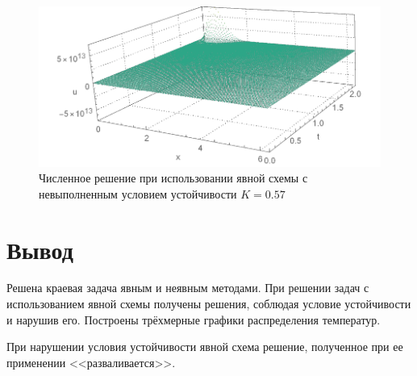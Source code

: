 \documentclass[
11pt,
master, %
subf, %
href, %
colorlinks=true, %
]{disser}
\begin{document}
\begin{figure}[htbp]
  \centering
  \includegraphics[width=1\linewidth]{vis_exp_2}
  \caption{Численное решение при использовании явной схемы с невыполненным условием устойчивости $K = 0.57$}\label{}
\end{figure}

\section{Вывод}
Решена краевая задача явным и неявным методами. При решении задач с использованием явной схемы получены решения, соблюдая условие устойчивости и нарушив его. Построены трёхмерные графики распределения температур.

При нарушении условия устойчивости явной схема решение, полученное при ее применении <<разваливается>>.
\end{document}
